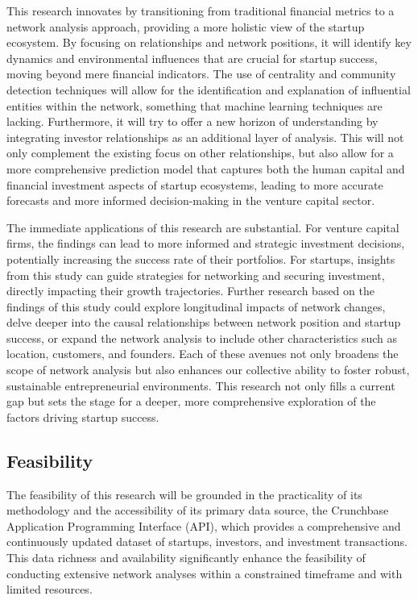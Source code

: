 \documentclass[a4paper,11pt]{article}
\begin{document}
This research innovates by transitioning from traditional financial metrics to a network analysis approach, providing a more holistic view of the startup ecosystem. By focusing on relationships and network positions, it will identify key dynamics and environmental influences that are crucial for startup success, moving beyond mere financial indicators. The use of centrality and community detection techniques will allow for the identification and explanation of influential entities within the network, something that machine learning techniques are lacking. Furthermore, it will try to offer a new horizon of understanding by integrating investor relationships as an additional layer of analysis. This will not only complement the existing focus on other relationships, but also allow for a more comprehensive prediction model that captures both the human capital and financial investment aspects of startup ecosystems, leading to more accurate forecasts and more informed decision-making in the venture capital sector.

The immediate applications of this research are substantial. For venture capital firms, the findings can lead to more informed and strategic investment decisions, potentially increasing the success rate of their portfolios. For startups, insights from this study can guide strategies for networking and securing investment, directly impacting their growth trajectories. Further research based on the findings of this study could explore longitudinal impacts of network changes, delve deeper into the causal relationships between network position and startup success, or expand the network analysis to include other characteristics such as location, customers, and founders. Each of these avenues not only broadens the scope of network analysis but also enhances our collective ability to foster robust, sustainable entrepreneurial environments. This research not only fills a current gap but sets the stage for a deeper, more comprehensive exploration of the factors driving startup success.

\subsection{Feasibility}

The feasibility of this research will be grounded in the practicality of its methodology and the accessibility of its primary data source, the Crunchbase Application Programming Interface (API), which provides a comprehensive and continuously updated dataset of startups, investors, and investment transactions. This data richness and availability significantly enhance the feasibility of conducting extensive network analyses within a constrained timeframe and with limited resources.
\end{document}
